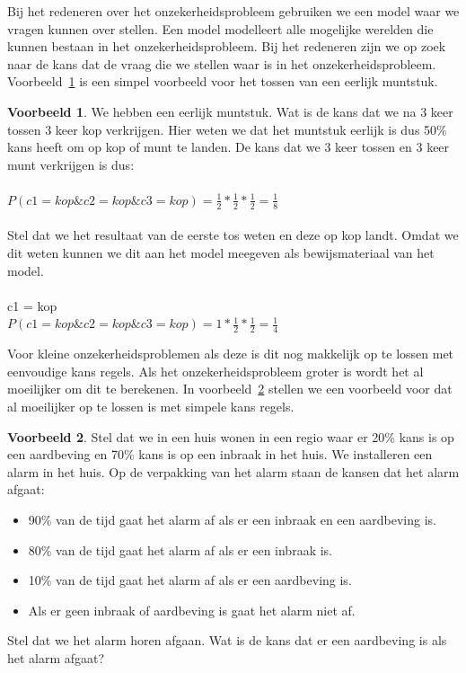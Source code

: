 \documentclass[12pt,a4paper,oneside]{book}
\theoremstyle{definition}
\newtheorem{exmp}{Voorbeeld}[section]
\begin{document}
Bij het redeneren over het onzekerheidsprobleem gebruiken we een model waar we vragen kunnen over stellen. Een model modelleert alle mogelijke werelden die kunnen bestaan in het onzekerheidsprobleem. Bij het redeneren zijn we op zoek naar de kans dat de vraag die we stellen waar is in het onzekerheidsprobleem. Voorbeeld~\ref{exmp:inferentiaexample} is een simpel voorbeeld voor het tossen van een eerlijk muntstuk.
\begin{exmp}
\label{exmp:inferentiaexample}
We hebben een eerlijk muntstuk. Wat is de kans dat we na 3 keer tossen 3 keer kop verkrijgen. Hier weten we dat het muntstuk eerlijk is dus 50\% kans heeft om op kop of munt te landen. De kans dat we 3 keer tossen en 3 keer munt verkrijgen is dus:
\\\\
$P(c1=kop \& c2=kop \& c3=kop) = \frac{1}{2} * \frac{1}{2} * \frac{1}{2} = \frac{1}{8}$
\\\\
Stel dat we het resultaat van de eerste tos weten en deze op kop landt. Omdat we dit weten kunnen we dit aan het model meegeven als bewijsmateriaal van het model.
\\\\
c1 = kop
\\
$P(c1=kop \& c2=kop \& c3=kop) = 1 * \frac{1}{2} * \frac{1}{2} = \frac{1}{4}$
\end{exmp}
Voor kleine onzekerheidsproblemen als deze is dit nog makkelijk op te lossen met eenvoudige kans regels. Als het onzekerheidsprobleem groter is wordt het al moeilijker om dit te berekenen. In voorbeeld~\ref{exmp:inferentiaexamplealarm} stellen we een voorbeeld voor dat al moeilijker op te lossen is met simpele kans regels.
\begin{exmp}
\label{exmp:inferentiaexamplealarm}
Stel dat we in een huis wonen in een regio waar er 20\% kans is op een aardbeving en 70\% kans is op een inbraak in het huis. We installeren een alarm in het huis. Op de verpakking van het alarm staan de kansen dat het alarm afgaat:
\begin{itemize}
	\item 90\% van de tijd gaat het alarm af als er een inbraak en een aardbeving is.
	\item 80\% van de tijd gaat het alarm af als er een inbraak is.
	\item 10\% van de tijd gaat het alarm af als er een aardbeving is.
	\item Als er geen inbraak of aardbeving is gaat het alarm niet af.
\end{itemize} 
Stel dat we het alarm horen afgaan. Wat is de kans dat er een aardbeving is als het alarm afgaat?
\end{exmp}
\end{document}
